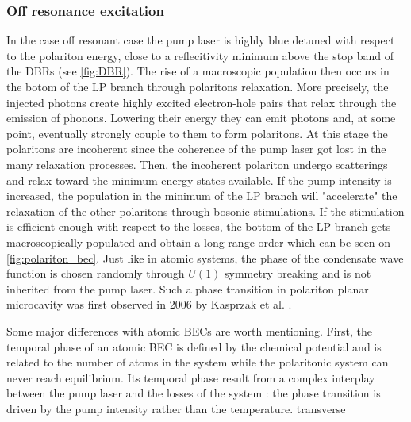 \subsubsection{Off resonance excitation} In the case off resonant case the pump laser is highly blue detuned with respect to the polariton energy, close to a reflecitivity minimum above the stop band of the DBRs (see \autoref{fig:DBR}).
The rise of a macroscopic population then occurs in the botom of the LP branch through polaritons relaxation. More precisely, the injected photons create highly excited electron-hole pairs that relax through the emission of phonons. 
Lowering their energy they can emit photons and, at some point, eventually strongly couple to them to form polaritons. At this stage the polaritons are incoherent since the coherence of the pump laser got lost in the many relaxation processes.
Then, the incoherent polariton undergo scatterings and relax toward the minimum energy states available. If the pump intensity is increased, the population in the minimum of the LP branch will "accelerate" the relaxation of the other polaritons through bosonic stimulations.
If the stimulation is efficient enough with respect to the losses, the bottom of the LP branch gets macroscopically populated and obtain a long range order which can be seen on \autoref{fig:polariton_bec}. Just like in atomic systems, the phase of the condensate wave function is chosen randomly through $U(1)$ symmetry breaking and is not inherited from the pump laser.
Such a phase transition in polariton planar microcavity was first observed in 2006 by Kasprzak et al. \cite{kasprzak_boseeinstein_2006}. 


Some major differences with atomic BECs are worth mentioning. First, the temporal phase of an atomic BEC is defined by the chemical potential and is related to the number of atoms in the system while 
the polaritonic system can never reach equilibrium. Its temporal phase result from a complex interplay between the pump laser and the losses of the system : the phase transition is driven by the pump intensity rather than the temperature.
transverse

